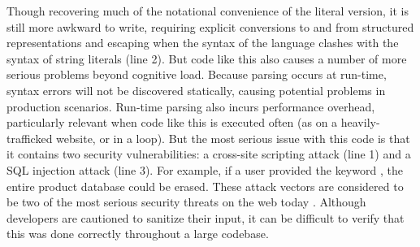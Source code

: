 Though recovering much of the notational convenience of the literal version, it is still more awkward to write, requiring explicit conversions to and from structured representations and escaping when the syntax of the language clashes with the syntax of string literals (line 2). But code like this also causes a number of more serious problems beyond cognitive load. Because parsing occurs at run-time, syntax errors will not be discovered statically, causing potential problems in production scenarios. Run-time parsing also incurs performance overhead, particularly relevant when code like this is executed often (as on a heavily-trafficked website, or in a loop). But the most serious issue with this code is that it contains two security vulnerabilities: a cross-site scripting attack (line 1) and a SQL injection attack (line 3). For example, if a user provided the keyword , the entire product database could be erased. These attack vectors are considered to be two of the most serious security threats on the web today \cite{owasp}. Although developers are cautioned to sanitize their input, it can be difficult to verify that this was done correctly throughout a large codebase.

